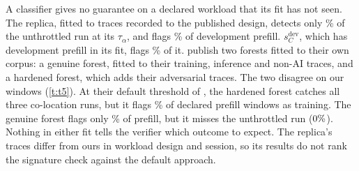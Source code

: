 A classifier gives no guarantee on a declared workload that its fit has not seen. The
replica, fitted to traces recorded to the published design, detects only
\XzeroPrime\% of the unthrottled run at its $\tau_\alpha$, and flags \RepPrefill\% of
development prefill. $s_C^{\mathrm{dev}}$, which has development prefill in its fit,
flags \ClfDevPrefill\% of it. \citet{gargiulo2026} publish two forests fitted to their
own corpus: a genuine forest, fitted to their training, inference and non-AI traces,
and a hardened forest, which adds their adversarial traces. The two disagree on our
windows (\cref{t:t5}). At their default threshold of \DefaultDecision, the hardened
forest catches all three co-location runs, but it flags \GkHardPrefill\% of declared
prefill windows as training. The genuine forest flags only \GkGenPrefill\% of prefill,
but it misses the unthrottled run ($0\%$). Nothing in either fit tells the
verifier which outcome to expect. The replica's traces differ from ours in workload
design and session, so its results do not rank the signature check against the default
approach.
